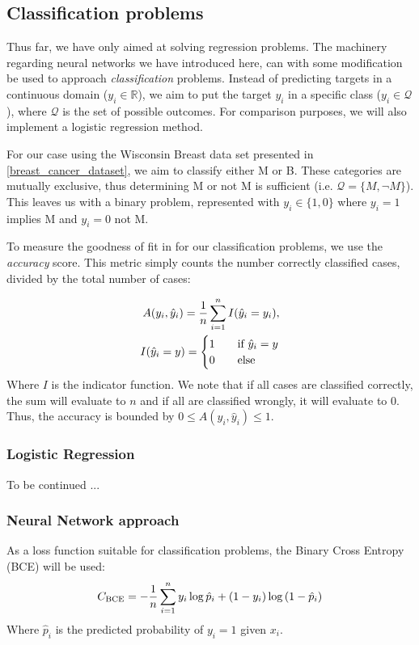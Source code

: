 
\subsection{Classification problems}
    Thus far, we have only aimed at solving regression problems. The machinery regarding neural networks we have introduced here, can with some modification be used to approach \textit{classification} problems. Instead of predicting targets in a continuous domain ($y_i \in \mathbb{R}$), we aim to put the target $y_i$ in a specific class ($y_i \in \mathcal{Q}$), where $\mathcal{Q}$ is the set of possible outcomes. For comparison purposes, we will also implement a logistic regression method.

    For our case using the Wisconsin Breast data set presented in \cref{breast_cancer_dataset}, we aim to classify either M or B. These categories are mutually exclusive, thus determining M or not M is sufficient (i.e. $\mathcal{Q} = \{ M, \neg M \}$). This leaves us with a binary problem, represented with $y_i \in \{ 1, 0 \}$ where $y_i = 1$ implies M and $y_i = 0$ not M.

    To measure the goodness of fit in for our classification problems, we use the \textit{accuracy} score. This metric simply counts the number correctly classified cases, divided by the total number of cases:

    \begin{align}
        A(y_i, \hat{y}_i) = \frac{1}{n}\sum_{i=1}^{n} I(\hat{y}_i = y_i), \\
        I(\hat{y}_i = y) = \begin{cases}
            1\hspace{10px}&\text{if }\hat{y}_i = y \\
            0\hspace{10px}&\text{else}
        \end{cases} \nonumber
    \end{align}
    Where $I$ is the indicator function. We note that if all cases are classified correctly, the sum will evaluate to $n$ and if all are classified wrongly, it will evaluate to 0. Thus, the accuracy is bounded by $0 \leq A(y_i, \hat{y}_i) \leq 1$.

    \subsubsection*{Logistic Regression}
    To be continued ...

    \subsubsection*{Neural Network approach}
    As a loss function suitable for classification problems, the Binary Cross Entropy (BCE) \cite{BCE} will be used:
    \begin{align}
        {C}_\text{BCE} = -\frac{1}{n}\sum_{i=1}^{n} y_i \log{\hat{p}_i} + (1-y_i) \log{(1-\hat{p}_i)}
        \label{eq:BCE_loss_function}
    \end{align} 
    Where $\hat{p}_i$ is the predicted probability of $y_i = 1$ given $x_i$.  